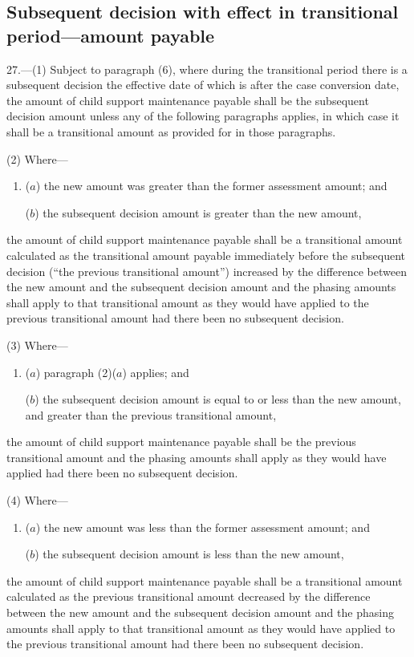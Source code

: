\documentclass[12pt,a4paper]{article}
\begin{document}
\subsection[27. Subsequent decision with effect in transitional period---amount payable]{\sloppy{} Subsequent decision with effect in transitional period---amount payable}

27.---(1)  Subject to paragraph (6), where during the transitional period there is a subsequent decision the effective date of which is after the case conversion date, the amount of child support maintenance payable shall be the subsequent decision amount unless any of the following paragraphs applies, in which case it shall be a transitional amount as provided for in those paragraphs.

(2) Where—
\begin{enumerate}\item[]
($a$) the new amount was greater than the former assessment amount; and

($b$) the subsequent decision amount is greater than the new amount,
\end{enumerate}
the amount of child support maintenance payable shall be a transitional amount calculated as the transitional amount payable immediately before the subsequent decision (“the previous transitional amount”) increased by the difference between the new amount and the subsequent decision amount and the phasing amounts shall apply to that transitional amount as they would have applied to the previous transitional amount had there been no subsequent decision.

(3) Where—
\begin{enumerate}\item[]
($a$) paragraph (2)($a$)  applies; and

($b$) the subsequent decision amount is equal to or less than the new amount,
and greater than the previous transitional amount,  %
\end{enumerate}
the amount of child support maintenance payable shall be the previous transitional amount and the phasing amounts shall apply as they would have applied had there been no subsequent decision.

(4) Where—
\begin{enumerate}\item[]
($a$) the new amount was less than the former assessment amount; and

($b$) the subsequent decision amount is less than the new amount,
\end{enumerate}
the amount of child support maintenance payable shall be a transitional amount calculated as the previous transitional amount decreased by the difference between the new amount and the subsequent decision amount and the phasing amounts shall apply to that transitional amount as they would have applied to the previous transitional amount had there been no subsequent decision.
\end{document}
